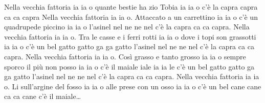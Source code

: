 \beginverse
Nella vecchia fattoria ia ia o
quante bestie ha zio Tobia ia ia o
c'è la capra capra ca ca capra
\endverse \beginverse
Nella vecchia fattoria ia ia o.
Attaccato a un carrettino ia ia o
c'è un quadrupede piccino ia ia o
l'asinel nel ne ne nel
c'è la capra ca ca capra.
\endverse \beginverse
Nella vecchia fattoria ia ia o.
Tra le casse e i ferri rotti ia ia o
dove i topi son grassotti ia ia o
c'è un bel gatto gatto ga ga gatto
l'asinel nel ne ne nel
c'è la capra ca ca capra.
\endverse \beginverse
Nella vecchia fattoria ia ia o.
Così grasso e tanto grosso ia ia o
sempre sporco il più non posso ia ia o
c'è il maiale iale ia ia le
c'è un bel gatto gatto ga ga gatto
l'asinel nel ne ne nel
c'è la capra ca ca capra.
\endverse \beginverse
Nella vecchia fattoria ia ia o.
Li sull'argine del fosso ia ia o
alle prese con un osso ia ia o
c'è un bel cane cane ca ca cane
c'è il maiale\dots
\endverse
\endsong
